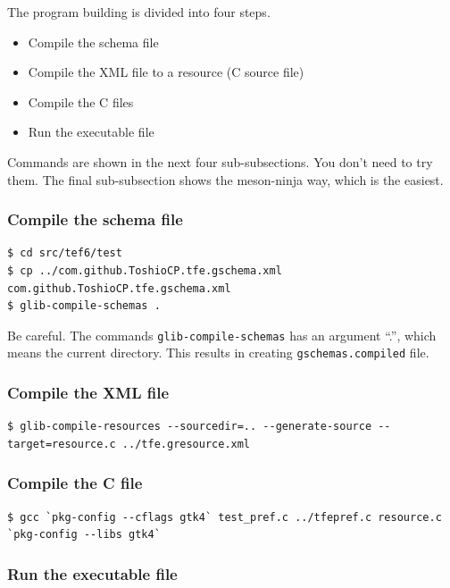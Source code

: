 The program building is divided into four steps.

\begin{itemize}
\tightlist
\item
  Compile the schema file
\item
  Compile the XML file to a resource (C source file)
\item
  Compile the C files
\item
  Run the executable file
\end{itemize}

Commands are shown in the next four sub-subsections. You don't need to
try them. The final sub-subsection shows the meson-ninja way, which is
the easiest.

\subsubsection{Compile the schema file}\label{compile-the-schema-file}

\begin{lstlisting}
$ cd src/tef6/test
$ cp ../com.github.ToshioCP.tfe.gschema.xml com.github.ToshioCP.tfe.gschema.xml
$ glib-compile-schemas .
\end{lstlisting}

Be careful. The commands \passthrough{\lstinline!glib-compile-schemas!}
has an argument ``.'', which means the current directory. This results
in creating \passthrough{\lstinline!gschemas.compiled!} file.

\subsubsection{Compile the XML file}\label{compile-the-xml-file}

\begin{lstlisting}
$ glib-compile-resources --sourcedir=.. --generate-source --target=resource.c ../tfe.gresource.xml
\end{lstlisting}

\subsubsection{Compile the C file}\label{compile-the-c-file}

\begin{lstlisting}
$ gcc `pkg-config --cflags gtk4` test_pref.c ../tfepref.c resource.c `pkg-config --libs gtk4`
\end{lstlisting}

\subsubsection{Run the executable file}\label{run-the-executable-file}

